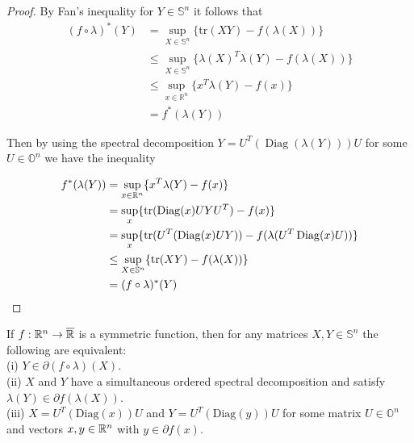 \begin{proof}
By Fan's inequality for $Y \in \mathbb{S}^n$ it follows that
\begin{align*}
(f \circ \lambda)^*(Y) &= \underset{X \in \mathbb{S}^n}{\operatorname{sup}} \{\mathrm{tr}(XY) - f(\lambda(X))\} \\
&\leq \underset{X \in \mathbb{S}^n}{\operatorname{sup}} \{\lambda(X)^T\lambda(Y) - f(\lambda(X))\} \\
&\leq \underset{x \in \mathbb{R}^n}{\operatorname{sup}} \{ x^T \lambda(Y) - f(x) \} \\
&= f^*(\lambda(Y))
\end{align*}

Then by using the spectral decomposition $Y = U^T(\operatorname{Diag}(\lambda(Y)))U$ for some $U \in \mathbb{O}^n$ we have the inequality

\begin{align*}
f^*(\lambda(Y)) &= \underset{x \in \Bbb R^n}{\operatorname{sup}} \{x^T \lambda(Y) - f(x) \} \\
&= \underset{x}{\operatorname{sup}} \{\operatorname{tr}(\operatorname{Diag}(x)UYU^T) - f(x) \} \\
&= \underset{x}{\operatorname{sup}} \{\operatorname{tr}(U^T(\operatorname{Diag}(x)UY)) - f(\lambda(U^T \operatorname{Diag}(x)U)) \} \\
&\leq \underset{X \in \mathbb{S}^n}{\operatorname{sup}} \{ \operatorname{tr}(XY) - f(\lambda(X)) \} \\
&= (f \circ \lambda)^*(Y)
\end{align*}

\end{proof}

\begin{theorem}
If $f: \Bbb R^n \rightarrow \overline{\Bbb R}$ is a symmetric function, then for any matrices $X, Y \in \mathbb{S}^n$ the following are equivalent:
\\
(i) $Y \in \partial(f \circ \lambda)(X)$.
\\
(ii) $X$ and $Y$ have a simultaneous ordered spectral decomposition and satisfy $\lambda(Y) \in \partial f(\lambda(X))$.
\\
(iii) $X = U^T(\mathrm{Diag}(x))U$ and $Y = U^T(\mathrm{Diag}(y))U$ for some matrix $U \in \mathbb{O}^n$ and vectors $x, y \in \Bbb R^n$ with $y \in \partial f(x)$.
\end{theorem}


